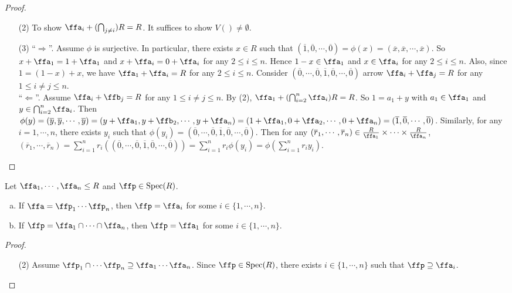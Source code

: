 \begin{proof}
    \begin{enumerate}
        \item [(2)]
            To show $\ffa_i + (\bigcap_{j \neq i})R = R$. It suffices to show $V() \neq \emptyset$.
        \item [(3)]
            ``$\Rightarrow$''. Assume $\phi$ is surjective. In particular, there exists $x \in R$ such that $(\overline 1,\overline 0,\cdots,\overline 0) = \phi(x) = (\overline x, \overline x, \cdots, \overline x)$. So $x+\ffa_1 = 1+\ffa_1$ and $x+\ffa_i = 0 + \ffa_i$ for any $2 \leq i \leq n$. Hence $1-x \in \ffa_1$ and $x \in \ffa_i$ for any $2 \leq i \leq n$. Also, since $1 = (1-x) + x$, we have $\ffa_1 + \ffa_i = R$ for any $2 \leq i \leq n$. Consider $(\overline 0, \cdots, \overline 0, \overline 1, \overline 0, \cdots, \overline 0)$ arrow $\ffa_i + \ffa_j = R$ for any $1 \leq i \neq j \leq n$. \\
            ``$\Leftarrow$''. Assume $\ffa_i + \ffb_j = R$ for any $1 \leq i \neq j \leq n$. By (2), $\ffa_1 + (\bigcap_{i=2}^n \ffa_i)R = R$. So $1 = a_1 + y$ with $a_1 \in \ffa_1$ and $y \in \bigcap_{i=2}^n \ffa_i$. Then $\phi(y) = (\overline y, \overline y, \cdots, \overline y) = (y + \ffa_1, y + \ffb_2, \cdots, y + \ffa_n) = (1+\ffa_1,0+\ffa_2,\cdots,0+\ffa_n) = (\overline 1,\overline 0, \cdots, \overline 0)$. Similarly, for any $i = 1,\cdots,n$, there exists $y_i$ such that $\phi(y_i) = (\overline 0, \cdots, \overline 0, \overline 1, \overline 0, \cdots, \overline 0)$. Then for any $(\overline r_1,\cdots, \overline r_n) \in \frac{R}{\ffa_1} \times \cdots \times \frac{R}{\ffa_n}$, $(\overline r_1,\cdots, \overline r_n) = \sum_{i=1}^n r_i((\overline 0, \cdots, \overline 0, \overline 1, \overline 0, \cdots, \overline 0)) = \sum_{i=1}^n r_i\phi(y_i) = \phi(\sum_{i=1}^nr_iy_i)$.
    \end{enumerate}
\end{proof}

\begin{proposition}
    Let $\ffa_1,\cdots,\ffa_n \leq R$ and $\ffp \in \operatorname{Spec}(R)$.
    \begin{enumerate}[(a)]
        \item If $\ffa = \ffp_1 \cdots \ffp_n$, then $\ffp = \ffa_i$ for some $i \in \{1,\cdots,n\}$.
        \item If $\ffp = \ffa_1 \cap \cdots \cap \ffa_n$, then $\ffp = \ffa_1$ for some $i \in \{1,\cdots,n\}$.
    \end{enumerate}
\end{proposition}

\begin{proof}
    \begin{enumerate}
        \item [(2)] Assume $\ffp_1 \cap \cdots \ffp_n \supseteq \ffa_1 \cdots \ffa_n$. Since $\ffp \in \operatorname{Spec}(R)$, there exists $i \in \{1,\cdots,n\}$ such that $\ffp \supseteq \ffa_i$.
    \end{enumerate}
\end{proof}

\begin{fact}
\end{fact}

